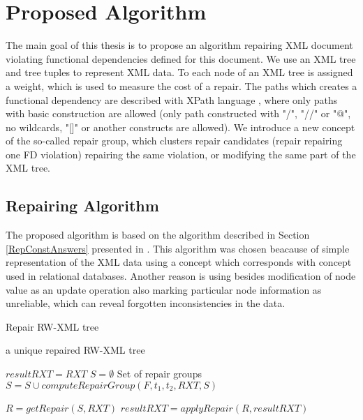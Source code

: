 \chapter{Proposed Algorithm}

The main goal of this thesis is to propose an algorithm repairing XML document violating functional dependencies defined for this document. We use an XML tree and tree tuples to represent XML data. To each node of an XML tree is assigned a weight, which is used to measure the cost of a repair. The paths which creates a functional dependency are described with XPath language \cite{xpath}, where only paths with basic construction are allowed (only path constructed with "/", "//" or "@", no wildcards, "[]" or another constructs are allowed). We introduce a new concept of the so-called repair group, which clusters repair candidates (repair repairing one FD violation) repairing the same violation, or modifying the same part of the XML tree.


\section{Repairing Algorithm}

The proposed algorithm is based on the algorithm described in Section \ref{RepConstAnswers} presented in \cite{RepAndConsistentAnswer}. This algorithm was chosen beacause of simple representation of the XML data using a concept which corresponds with concept used in relational databases. Another reason is using besides modification of node value as an update operation also marking particular node information as unreliable, which can reveal forgotten inconsistencies in the data.

\begin{algorithm}
\caption{Repair RW-XML tree}
\label{propAlgo}
\begin{algorithmic}[1]
\ENSURE a unique repaired RW-XML tree

\STATE $resultRXT = RXT$
    \STATE $S = \emptyset$ \COMMENT Set of repair groups
		    \STATE $S = S \cup computeRepairGroup(F, t_1, t_2, RXT, S)$
	    \ENDFOR
    \ENDFOR

    \STATE $R = getRepair(S, RXT)$
    \STATE $resultRXT = applyRepair(R, resultRXT)$
\ENDWHILE

\end{algorithmic}
\end{algorithm}

